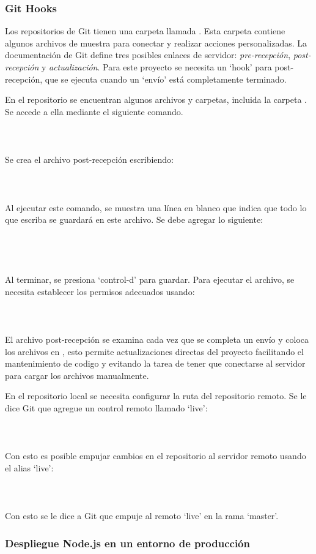 \subsubsection{Git Hooks}
Los repositorios de Git tienen una carpeta llamada . Esta carpeta contiene algunos archivos de muestra para conectar y realizar acciones personalizadas. La documentación de Git define tres posibles enlaces de servidor: \textit{pre-recepción}, \textit{post-recepción} y \textit{actualización}. Para este proyecto se necesita un `hook' para post-recepción, que se ejecuta cuando un `envío' está completamente terminado.
\vspace{0.8cm}

En el repositorio se encuentran algunos archivos y carpetas, incluida la carpeta . Se accede a ella mediante el siguiente comando.\\
\\
\\
\\
Se crea el archivo post-recepción escribiendo:\\
\\
\\
\\
Al ejecutar este comando, se muestra una línea en blanco que indica que todo lo que escriba se guardará en este archivo. Se debe agregar lo siguiente:\\
\\
\\
\\
\\
Al terminar, se presiona `control-d' para guardar. Para ejecutar el archivo, se necesita establecer los permisos adecuados usando:\\
\\
\\
\\
El archivo post-recepción se examina cada vez que se completa un envío y coloca los archivos en , esto permite actualizaciones directas del proyecto facilitando el mantenimiento de codigo y evitando la tarea de tener que conectarse al servidor para cargar los archivos manualmente.
\vspace{0.8cm}

En el repositorio local se necesita configurar la ruta del repositorio remoto. Se le dice Git que agregue un control remoto llamado `live':\\
\\
\\
\\
Con esto es posible empujar cambios en el repositorio al servidor remoto usando el alias `live':\\
\\
\\
\\
Con esto se le dice a Git que empuje al remoto `live' en la rama `master'.
\vspace{0.8cm}

\subsubsection{Despliegue Node.js en un entorno de producción}

